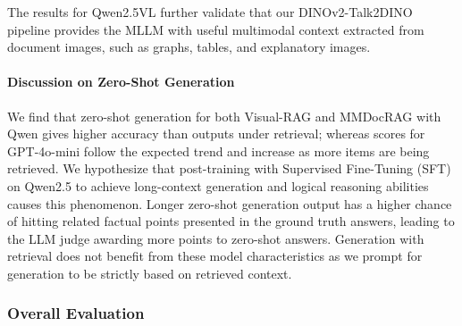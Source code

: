 The results for Qwen2.5VL further validate that our DINOv2-Talk2DINO pipeline provides the MLLM with useful multimodal context extracted from document images,
such as graphs, tables, and explanatory images.

\paragraph{Discussion on Zero-Shot Generation}
We find that zero-shot generation for both Visual-RAG and MMDocRAG with Qwen gives higher accuracy than outputs under retrieval;
whereas scores for GPT-4o-mini follow the expected trend and increase as more items are being retrieved.
We hypothesize that post-training with Supervised Fine-Tuning (SFT) on Qwen2.5 to achieve long-context generation 
and logical reasoning abilities \cite{qwen2025qwen25technicalreport} causes this phenomenon.
Longer zero-shot generation output has a higher chance of hitting related factual points presented in the ground truth answers,
leading to the LLM judge awarding more points to zero-shot answers.
Generation with retrieval does not benefit from these model characteristics as we prompt for generation to be strictly based on retrieved context.

\subsubsection{Overall Evaluation}

